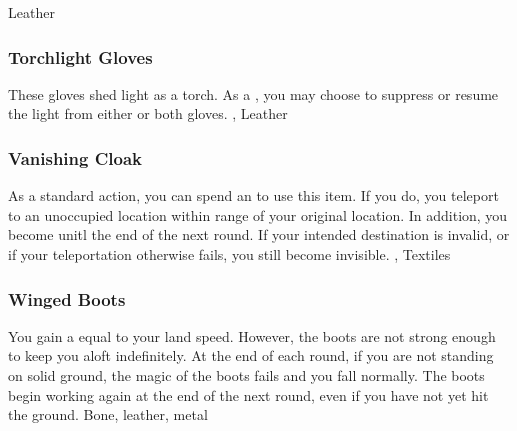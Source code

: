  
 Leather
\lowercase{\hypertarget{item:Torchlight Gloves}{}}\label{item:Torchlight Gloves}
\hypertarget{item:Torchlight Gloves}{\subsubsection{Torchlight Gloves\hfill{}}}
These gloves shed light as a torch.
As a , you may choose to suppress or resume the light from either or both gloves.
 , 
 Leather
\lowercase{\hypertarget{item:Vanishing Cloak}{}}\label{item:Vanishing Cloak}
\hypertarget{item:Vanishing Cloak}{\subsubsection{Vanishing Cloak\hfill{}}}
As a standard action, you can spend an  to use this item.
If you do, you teleport to an unoccupied location within \rngmed range of your original location.
In addition, you become  unitl the end of the next round.
If your intended destination is invalid, or if your teleportation otherwise fails, you still become invisible.
 , 
 Textiles
\lowercase{\hypertarget{item:Winged Boots}{}}\label{item:Winged Boots}
\hypertarget{item:Winged Boots}{\subsubsection{Winged Boots\hfill{}}}
You gain a  equal to your land speed.
However, the boots are not strong enough to keep you aloft indefinitely.
At the end of each round, if you are not standing on solid ground, the magic of the boots fails and you fall normally.
The boots begin working again at the end of the next round, even if you have not yet hit the ground.
 
 Bone, leather, metal